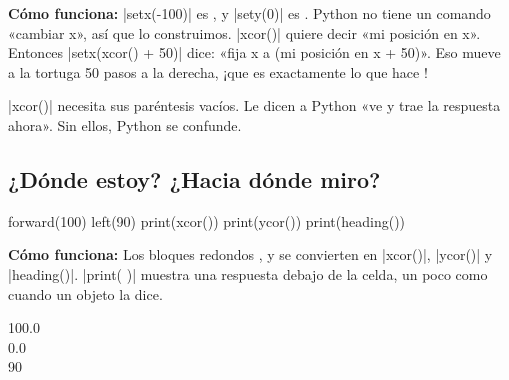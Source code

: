 \textbf{Cómo funciona:} \py|setx(-100)| es , y \py|sety(0)| es . Python no tiene un comando «cambiar x», así que lo construimos. \py|xcor()| quiere decir «mi posición en x». Entonces \py|setx(xcor() + 50)| dice: «fija x a (mi posición en x + 50)». Eso mueve a la tortuga 50 pasos a la derecha, ¡que es exactamente lo que hace !

\begin{watchout}
\py|xcor()| necesita sus paréntesis vacíos. Le dicen a Python «ve y trae la respuesta ahora». Sin ellos, Python se confunde.
\end{watchout}

\subsection*{¿Dónde estoy? ¿Hacia dónde miro?}

\begin{tcbraster}[raster columns=2, raster equal height=rows, raster column skip=12pt, raster valign=center]
\begin{tcolorbox}[colback=white, colframe=white, boxrule=0pt, valign=center]
\begin{scratch}[scale=0.85]
\end{scratch}
\end{tcolorbox}
\begin{code}
forward(100)
left(90)
print(xcor())
print(ycor())
print(heading())
\end{code}
\end{tcbraster}

\textbf{Cómo funciona:} Los bloques redondos ,  y  se convierten en \py|xcor()|, \py|ycor()| y \py|heading()|. \py|print( )| muestra una respuesta debajo de la celda, un poco como cuando un objeto la dice.

\begin{outputbox}
100.0\\
0.0\\
90
\end{outputbox}

